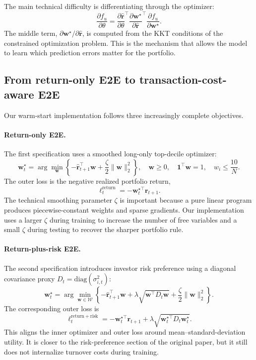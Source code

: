 \documentclass[11pt]{article}
\begin{document}
The main technical difficulty is differentiating through the optimizer:
\[
    \frac{\partial f_u}{\partial \theta}
    =
    \frac{\partial \widehat{\bm r}}{\partial \theta}^{\top}
    \frac{\partial \bm w^\star}{\partial \widehat{\bm r}}^{\top}
    \frac{\partial f_u}{\partial \bm w^\star}.
\]
The middle term, $\partial \bm w^\star/\partial \widehat{\bm r}$, is computed from the KKT conditions of the constrained optimization problem. This is the mechanism that allows the model to learn which prediction errors matter for the portfolio.

\subsection{From return-only E2E to transaction-cost-aware E2E}

Our warm-start implementation follows three increasingly complete objectives.

\paragraph{Return-only E2E.}
The first specification uses a smoothed long-only top-decile optimizer:
\begin{equation}
    \bm w_t^\star
    =
    \arg\min_{\bm w}
    \left\{
    -\widehat{\bm r}_{t+1}^{\top}\bm w
    +\frac{\zeta}{2}\|\bm w\|_2^2
    \right\},
    \quad
    \bm w\ge 0,\quad \bm 1^\top \bm w=1,\quad w_i\le \frac{10}{N}.
    \label{eq:return_only_inner}
\end{equation}
The outer loss is the negative realized portfolio return,
\[
    \ell_t^{\mathrm{return}}= -\bm w_t^{\star\top}\bm r_{t+1}.
\]
The technical smoothing parameter $\zeta$ is important because a pure linear program produces piecewise-constant weights and sparse gradients. Our implementation uses a larger $\zeta$ during training to increase the number of free variables and a small $\zeta$ during testing to recover the sharper portfolio rule.

\paragraph{Return-plus-risk E2E.}
The second specification introduces investor risk preference using a diagonal covariance proxy $D_t=\mathrm{diag}(\sigma_{i,t}^2)$:
\begin{equation}
    \bm w_t^\star
    =
    \arg\min_{\bm w\in\mathcal{W}}
    \left\{
    -\widehat{\bm r}_{t+1}^{\top}\bm w
    +\lambda\sqrt{\bm w^\top D_t\bm w}
    +\frac{\zeta}{2}\|\bm w\|_2^2
    \right\}.
    \label{eq:return_risk_inner}
\end{equation}
The corresponding outer loss is
\[
    \ell_t^{\mathrm{return+risk}}
    =
    -\bm w_t^{\star\top}\bm r_{t+1}
    +\lambda\sqrt{\bm w_t^{\star\top}D_t\bm w_t^\star}.
\]
This aligns the inner optimizer and outer loss around mean--standard-deviation utility. It is closer to the risk-preference section of the original paper, but it still does not internalize turnover costs during training.
\end{document}
